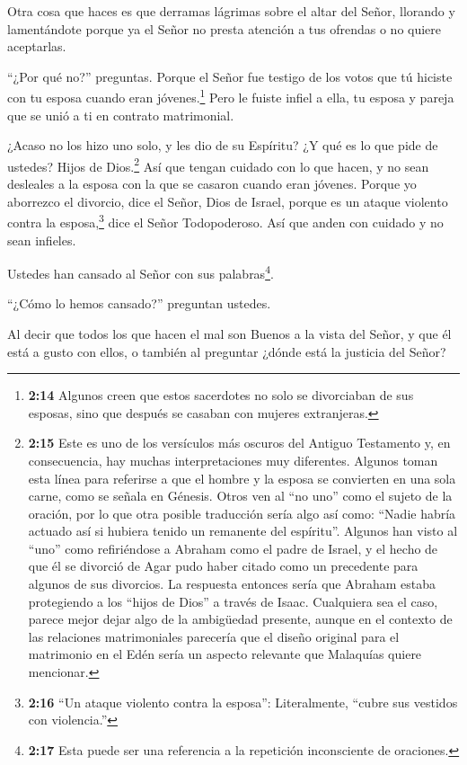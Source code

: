  Otra cosa que haces es que derramas lágrimas sobre el
altar del Señor, llorando y lamentándote porque ya el Señor no presta
atención a tus ofrendas o no quiere aceptarlas.

 ``¿Por qué no?'' preguntas. Porque el Señor fue testigo de
los votos que tú hiciste con tu esposa cuando eran jóvenes.\footnote{\textbf{2:14}
  Algunos creen que estos sacerdotes no solo se divorciaban de sus
  esposas, sino que después se casaban con mujeres extranjeras.} Pero le
fuiste infiel a ella, tu esposa y pareja que se unió a ti en contrato
matrimonial.

 ¿Acaso no los hizo uno solo, y les dio de su Espíritu? ¿Y
qué es lo que pide de ustedes? Hijos de Dios.\footnote{\textbf{2:15}
  Este es uno de los versículos más oscuros del Antiguo Testamento y, en
  consecuencia, hay muchas interpretaciones muy diferentes. Algunos
  toman esta línea para referirse a que el hombre y la esposa se
  convierten en una sola carne, como se señala en Génesis. Otros ven al
  ``no uno'' como el sujeto de la oración, por lo que otra posible
  traducción sería algo así como: ``Nadie habría actuado así si hubiera
  tenido un remanente del espíritu''. Algunos han visto al ``uno'' como
  refiriéndose a Abraham como el padre de Israel, y el hecho de que él
  se divorció de Agar pudo haber citado como un precedente para algunos
  de sus divorcios. La respuesta entonces sería que Abraham estaba
  protegiendo a los ``hijos de Dios'' a través de Isaac. Cualquiera sea
  el caso, parece mejor dejar algo de la ambigüedad presente, aunque en
  el contexto de las relaciones matrimoniales parecería que el diseño
  original para el matrimonio en el Edén sería un aspecto relevante que
  Malaquías quiere mencionar.} Así que tengan cuidado con lo que hacen,
y no sean desleales a la esposa con la que se casaron cuando eran
jóvenes.  Porque yo aborrezco el divorcio, dice el Señor,
Dios de Israel, porque es un ataque violento contra la
esposa,\footnote{\textbf{2:16} ``Un ataque violento contra la esposa'':
  Literalmente, ``cubre sus vestidos con violencia.''} dice el Señor
Todopoderoso. Así que anden con cuidado y no sean infieles.

 Ustedes han cansado al Señor con sus palabras\footnote{\textbf{2:17}
  Esta puede ser una referencia a la repetición inconsciente de
  oraciones.}.

``¿Cómo lo hemos cansado?'' preguntan ustedes.

Al decir que todos los que hacen el mal son Buenos a la vista del Señor,
y que él está a gusto con ellos, o también al preguntar ¿dónde está la
justicia del Señor?

